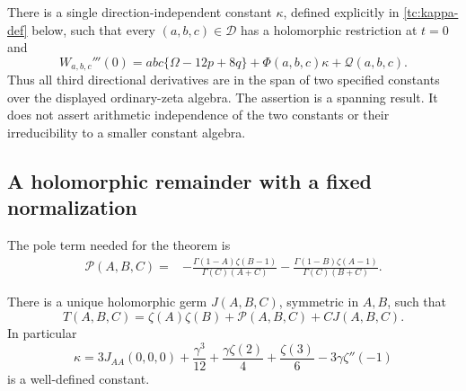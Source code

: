 \begin{theorem}
\label{tc:main}
There is a single direction-independent constant $\kappa$, defined
explicitly in \eqref{tc:kappa-def} below, such that every
$(a,b,c)\in\mathscr D$ has a holomorphic restriction at $t=0$ and
\begin{equation}
 \boxed{\displaystyle
 W_{a,b,c}'''(0)
   =abc\{\Omega-12p+8q\}
      +\Phi(a,b,c)\kappa+\mathscr Q(a,b,c).}
 \label{tc:third}
\end{equation}
Thus all third directional derivatives are in the span of two
specified constants over the displayed ordinary-zeta algebra.
The assertion is a spanning result.  It does not assert arithmetic
independence of the two constants or their irreducibility to a
smaller constant algebra.
\end{theorem}

\subsection{A holomorphic remainder with a fixed normalization}

The pole term needed for the theorem is
\begin{align}
 \mathscr P(A,B,C)
 ={}&-\frac{\Gamma(1-A)\zeta(B-1)}{\Gamma(C)(A+C)}
     -\frac{\Gamma(1-B)\zeta(A-1)}{\Gamma(C)(B+C)}.
 \label{tc:polar}
\end{align}

\begin{lemma}
\label{tc:local}
There is a unique holomorphic germ $J(A,B,C)$, symmetric in $A,B$,
such that
\begin{equation}
 T(A,B,C)=\zeta(A)\zeta(B)+\mathscr P(A,B,C)+C J(A,B,C).
 \label{tc:decomposition}
\end{equation}
In particular
\begin{equation}
 \kappa=3J_{AA}(0,0,0)+\frac{\gamma^3}{12}
       +\frac{\gamma\zeta(2)}4+\frac{\zeta(3)}6
       -3\gamma\zeta''(-1)
 \label{tc:kappa-def}
\end{equation}
is a well-defined constant.
\end{lemma}

